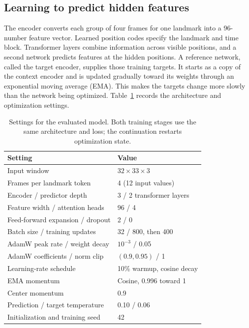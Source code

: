 \documentclass[10pt,twocolumn,letterpaper]{article}
\begin{document}
\subsection{Learning to predict hidden features}
The encoder converts each group of four frames for one landmark into a 96-number feature vector. Learned position codes specify the landmark and time block. Transformer layers combine information across visible positions, and a second network predicts features at the hidden positions. A reference network, called the target encoder, supplies those training targets. It starts as a copy of the context encoder and is updated gradually toward its weights through an exponential moving average (EMA). This makes the targets change more slowly than the network being optimized. Table~\ref{tab:settings} records the architecture and optimization settings.

\begin{table}[t]
\centering
\caption{Settings for the evaluated model. Both training stages use the same architecture and loss; the continuation restarts optimization state.}
\label{tab:settings}
\small
\setlength{\tabcolsep}{4pt}
\begin{tabular}{p{}p{}}
\toprule
Setting & Value\\
\midrule
Input window & $32\times33\times3$\\
Frames per landmark token & 4 (12 input values)\\
Encoder / predictor depth & 3 / 2 transformer layers\\
Feature width / attention heads & 96 / 4\\
Feed-forward expansion / dropout & 2 / 0\\
Batch size / training updates & 32 / 800, then 400\\
AdamW peak rate / weight decay & $10^{-3}$ / 0.05\\
AdamW coefficients / norm clip & $(0.9,0.95)$ / 1\\
Learning-rate schedule & 10\% warmup, cosine decay\\
EMA momentum & Cosine, 0.996 toward 1\\
Center momentum & 0.9\\
Prediction / target temperature & 0.10 / 0.06\\
Initialization and training seed & 42\\
\bottomrule
\end{tabular}
\end{table}
\end{document}
